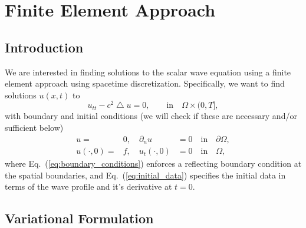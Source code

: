 \documentclass[nofootinbib,preprintnumbers,superscriptaddress,notitlepage]{revtex4-1}
\newcommand{\<}{\begin{equation}}
\newcommand{\?}{\end{equation}}
\begin{document}
\appendix
\section{Finite Element Approach}

\subsection{Introduction}

We are interested in finding solutions to the scalar wave equation using a 
finite element approach using spacetime discretization. Specifically, we want
to find solutions $u(x, t)$ to
\begin{equation}
\label{eq:wave_equation}
u_{tt} - c^2 \bigtriangleup u = 0, \qquad \text{in} \quad \Omega \times (0, T],
\end{equation}
with boundary and initial conditions (we will check if these are necessary
and/or sufficient below)
\begin{eqnarray}
\label{eq:boundary_conditions}
u =& 0,\quad \partial_{n} u &= 0 \quad \text{in} \quad \partial\Omega,\\
\label{eq:initial_data}
u(\cdot, 0) =& f,\quad u_t(\cdot, 0) &=  0 \quad \text{in} \quad \Omega,
\end{eqnarray}
where Eq.~(\ref{eq:boundary_conditions}) enforces a reflecting boundary
condition at the spatial boundaries, and Eq.~(\ref{eq:initial_data}) specifies
the initial data in terms of the wave profile and it's derivative at $t=0$.\\

\subsection{Variational Formulation}
\end{document}
